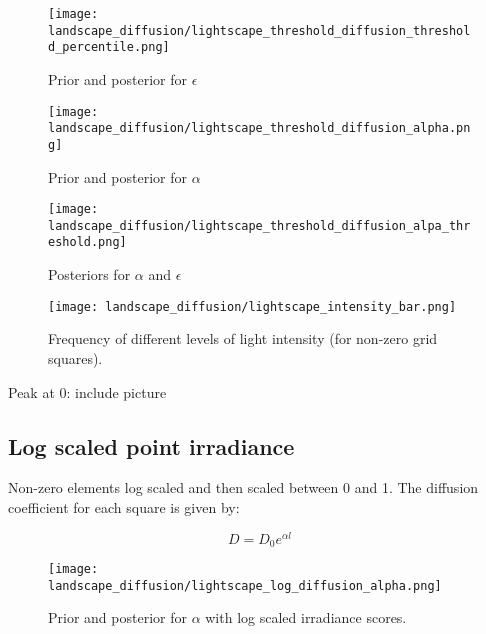 \begin{figure} [h]
    \centering
    \texttt{[image: landscape\_diffusion/lightscape\_threshold\_diffusion\_threshold\_percentile.png]}
    \label{fig:epsilon_threshold}
    \caption{Prior and posterior for $\epsilon$}
\end{figure}


\begin{figure} [h]
    \centering
    \texttt{[image: landscape\_diffusion/lightscape\_threshold\_diffusion\_alpha.png]}
    \label{fig:alpha_threshold}
    \caption{Prior and posterior for $\alpha$}
\end{figure}

\begin{figure} [h]
    \centering
    \texttt{[image: landscape\_diffusion/lightscape\_threshold\_diffusion\_alpa\_threshold.png]}
    \label{fig:}
    \caption{Posteriors for $\alpha$ and $\epsilon$}
\end{figure}

\begin{figure} [h]
    \centering
    \texttt{[image: landscape\_diffusion/lightscape\_intensity\_bar.png]}
    \label{fig:nnz_frequency}
    \caption{Frequency of different levels of light intensity (for non-zero grid squares).}


\end{figure}

Peak at 0: include picture


\pagebreak
\pagebreak
\pagebreak

\subsection{Log scaled point irradiance}

Non-zero elements log scaled and then scaled between 0 and 1.
The diffusion coefficient for each square is given by:

$$D = D_0 e^{\alpha l} $$

\begin{figure} [h]
    \centering
    \texttt{[image: landscape\_diffusion/lightscape\_log\_diffusion\_alpha.png]}
    \label{fig:log_diffusion}
    \caption{Prior and posterior for $\alpha$ with log scaled irradiance scores.}
\end{figure}



